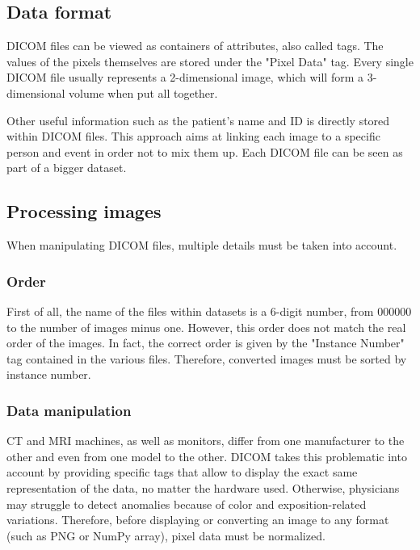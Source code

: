 \subsection{Data format}
\setlength{\marginparwidth}{3cm}\leavevmode {}DICOM files can be viewed as containers of attributes, also called tags. The values of the pixels themselves are stored under the "Pixel Data" tag. Every single DICOM file usually represents a 2-dimensional image, which will form a 3-dimensional volume when put all together.

Other useful information such as the patient's name and ID is directly stored within DICOM files. This approach aims at linking each image to a specific person and event in order not to mix them up. Each DICOM file can be seen as part of a bigger dataset. 


\subsection{Processing images}
\setlength{\marginparwidth}{3cm}\leavevmode {}When manipulating DICOM files, multiple details must be taken into account. 


\subsubsection{Order}
\setlength{\marginparwidth}{3cm}\leavevmode {}First of all, the name of the files within datasets is a 6-digit number, from 000000 to the number of images minus one. However, this order does not match the real order of the images. In fact, the correct order is given by the "Instance Number" tag contained in the various files. Therefore, converted images must be sorted by instance number. 


\subsubsection{Data manipulation}
\label{sec:dicom_data_manipulation}
\setlength{\marginparwidth}{3cm}\leavevmode {}CT and MRI machines, as well as monitors, differ from one manufacturer to the other and even from one model to the other. DICOM takes this problematic into account by providing specific tags that allow to display the exact same representation of the data, no matter the hardware used. Otherwise, physicians may struggle to detect anomalies because of color and exposition-related variations. 
Therefore, before displaying or converting an image to any format (such as PNG or NumPy array), pixel data must be normalized.

